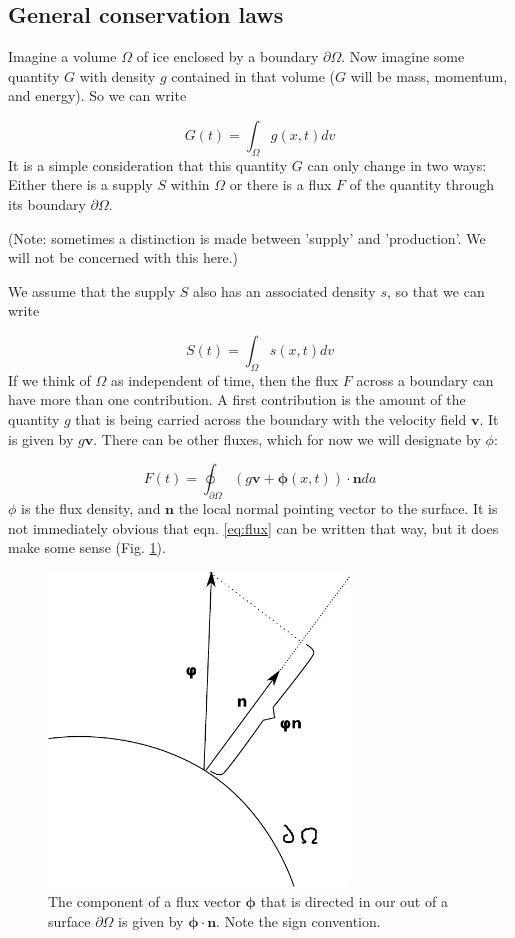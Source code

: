 \documentclass[12pt, openany]{memoir}
\begin{document}
\subsection{General conservation laws}

Imagine a volume $\Omega$ of ice enclosed by a boundary
$\partial \Omega$. Now imagine some quantity $G$ with density $g$
contained in that volume ($G$ will be mass, momentum, and energy). So
we can write

\begin{equation}
G(t) = \int_\Omega g(x,t) dv
\end{equation}
It is a simple consideration that this quantity $G$ can only change in
two ways: Either there is a supply $S$ within $\Omega$ or there is a
flux $F$ of the quantity through its boundary $\partial \Omega$.

(Note: sometimes a distinction is made between 'supply' and
'production'. We will not be concerned with this here.)

We assume that the supply $S$ also has an associated density $s$, so
that we can write

\begin{equation}
S(t) = \int_\Omega s(x,t) dv
\end{equation}
If we think of $\Omega$ as independent of time, then the flux $F$
across a boundary can have more than one contribution. A first
contribution is the amount of the quantity $g$ that is being carried
across the boundary with the velocity field $\mathbf{v}$. It is given
by $g \mathbf{v}$. There can be other fluxes, which for now we will
designate by $\phi$:

\begin{equation} \label{eq:flux}
F(t) = \oint_{\partial \Omega} (g \mathbf{v} + \mathbf{\phi}(x,t))
\cdot \mathbf{n} da 
\end{equation}
$\phi$ is the flux density, and $\mathbf{n}$ the local normal pointing
vector to the surface. It is not immediately obvious that
eqn. \ref{eq:flux} can be written that way, but it does make some
sense (Fig. \ref{fig:flux}).

\begin{figure}
\includegraphics[width=8cm]{flux}
\caption{\label{fig:flux} The component of a flux vector
$\mathbf{\phi}$ that is directed in our out of a surface
$\partial \Omega$ is given by $\mathbf{\phi} \cdot \mathbf{n}$. Note
the sign convention.}
\end{figure}
\end{document}

